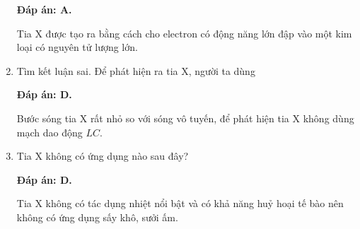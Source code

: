 \begin{enumerate}[label=\bfseries Câu \arabic*:]
	\loigiai
	{		\textbf{Đáp án: A.}
		
		Tia X được tạo ra bằng cách cho electron có động năng lớn đập vào một kim loại có nguyên tử lượng lớn. 
	}
		\item {} 
	\cauhoi
	{Tìm kết luận sai. Để phát hiện ra tia X, người ta dùng
		
	}
	
	\loigiai
	{		\textbf{Đáp án: D.}
		
		 Bước sóng tia X rất nhỏ so với sóng vô tuyến, để phát hiện tia X không dùng mạch dao động $LC$. 
	}
	\item {} 
	\cauhoi
	{Tia X không có ứng dụng nào sau đây?
		
	}
	
	\loigiai
	{		\textbf{Đáp án: D.}
		
		Tia X không có tác dụng nhiệt nổi bật và có khả năng huỷ hoại tế bào nên không có ứng dụng sấy khô, sưởi ấm.
	}
\end{enumerate}


